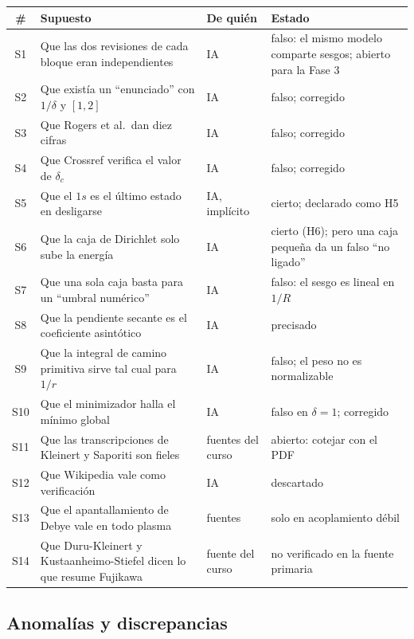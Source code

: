 \documentclass[11pt]{article}
\newcommand{\dc}{\delta_c}
\begin{document}
\begin{longtable}{@{}cL{5.6cm}L{2.6cm}L{4.6cm}@{}}
\toprule
\# & \textbf{Supuesto} & \textbf{De quién} & \textbf{Estado}\\
\midrule
\endhead
S1 & Que las dos revisiones de cada bloque eran independientes & IA & falso: el mismo modelo comparte sesgos; abierto para la Fase 3\\
S2 & Que existía un ``enunciado'' con $1/\delta$ y $[1,2]$ & IA & falso; corregido\\
S3 & Que Rogers et al.\ dan diez cifras & IA & falso; corregido\\
S4 & Que Crossref verifica el valor de $\dc$ & IA & falso; corregido\\
S5 & Que el $1s$ es el último estado en desligarse & IA, implícito & cierto; declarado como H5\\
S6 & Que la caja de Dirichlet solo sube la energía & IA & cierto (H6); pero una caja pequeña da un falso ``no ligado''\\
S7 & Que una sola caja basta para un ``umbral numérico'' & IA & falso: el sesgo es lineal en $1/R$\\
S8 & Que la pendiente secante es el coeficiente asintótico & IA & precisado\\
S9 & Que la integral de camino primitiva sirve tal cual para $1/r$ & IA & falso; el peso no es normalizable\\
S10 & Que el minimizador halla el mínimo global & IA & falso en $\delta=1$; corregido\\
S11 & Que las transcripciones de Kleinert y Saporiti son fieles & fuentes del curso & abierto: cotejar con el PDF\\
S12 & Que Wikipedia vale como verificación & IA & descartado\\
S13 & Que el apantallamiento de Debye vale en todo plasma & fuentes & solo en acoplamiento débil\\
S14 & Que Duru-Kleinert y Kustaanheimo-Stiefel dicen lo que resume Fujikawa & fuente del curso & no verificado en la fuente primaria\\
\bottomrule
\end{longtable}

\subsection{Anomalías y discrepancias}
\end{document}
